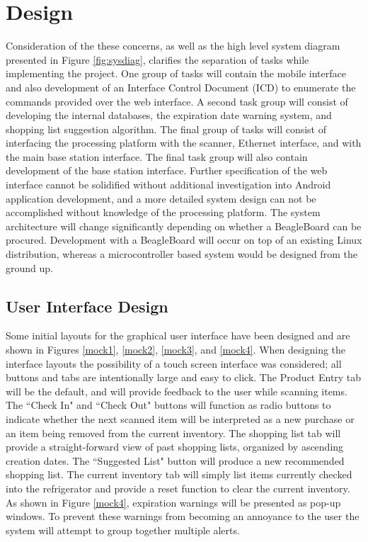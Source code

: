 \documentclass[11pt]{article} %
\begin{document}
\section{Design}
Consideration of the these concerns, as well as the high level system diagram presented in Figure \ref{fig:sysdiag}, clarifies the separation of tasks while implementing the project. One group of tasks will contain the mobile interface and also development of an Interface Control Document (ICD) to enumerate the commands provided over the web interface. A second task group will consist of developing the internal databases, the expiration date warning system, and shopping list suggestion algorithm. The final group of tasks will consist of interfacing the processing platform with the scanner, Ethernet interface, and with the main base station interface. The final task group will also contain development of the base station interface.
\newline \quad \newline
Further specification of the web interface cannot be solidified without additional investigation into Android application development, and a more detailed system design can not be accomplished without knowledge of the processing platform. The system architecture will change significantly depending on whether a BeagleBoard can be procured. Development with a BeagleBoard will occur on top of an existing Linux distribution, whereas a microcontroller based system would be designed from the ground up.
\subsection{User Interface Design}
Some initial layouts for the graphical user interface have been designed and are shown in Figures \ref{mock1}, \ref{mock2}, \ref{mock3}, and \ref{mock4}. When designing the interface layouts the possibility of a touch screen interface was considered; all buttons and tabs are intentionally large and easy to click. The Product Entry tab will be the default, and will provide feedback to the user while scanning items. The ``Check In" and ``Check Out" buttons will function as radio buttons to indicate whether the next scanned item will be interpreted as a new purchase or an item being removed from the current inventory. The shopping list tab will provide a straight-forward view of past shopping lists, organized by ascending creation dates. The ``Suggested List" button will produce a new recommended shopping list. The current inventory tab will simply list items currently checked into the refrigerator and provide a reset function to clear the current inventory. As shown in Figure \ref{mock4}, expiration warnings will be presented as pop-up windows. To prevent these warnings from becoming an annoyance to the user the system will attempt to group together multiple alerts.
\end{document}

